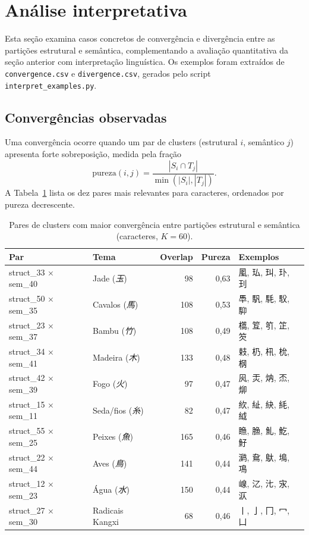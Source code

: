 \documentclass[10pt, a4paper, titlepage]{extarticle}
\begin{document}
\section{Análise interpretativa}
Esta seção examina casos concretos de convergência e divergência entre as partições estrutural e semântica, complementando a avaliação quantitativa da seção anterior com interpretação linguística. Os exemplos foram extraídos de \texttt{convergence.csv} e \texttt{divergence.csv}, gerados pelo script \texttt{interpret\_examples.py}.

\subsection{Convergências observadas}
Uma convergência ocorre quando um par de clusters (estrutural $i$,
semântico $j$) apresenta forte sobreposição, medida pela fração
\[
    \text{pureza}(i,j) = \frac{|S_i \cap T_j|}{\min(|S_i|, |T_j|)}.
\]
A Tabela~\ref{tab:convergencias} lista os dez pares mais relevantes para
caracteres, ordenados por pureza decrescente.

\begin{table}[H]
\centering
\small
\renewcommand{\arraystretch}{1.15}
\begin{tabular}{llrrp{4.2cm}}
\toprule
\textbf{Par} & \textbf{Tema} & \textbf{Overlap} & \textbf{Pureza} &
\textbf{Exemplos} \\
\midrule
struct\_33 $\times$ sem\_40 & Jade (\textit{玉})     & 98  & 0,63 &
    㓘, 㺨, 㺩, 㺪, 㺫 \\
struct\_50 $\times$ sem\_35 & Cavalos (\textit{馬})  & 108 & 0,53 &
    䭴, 䭵, 䭷, 䭸, 䭹 \\
struct\_23 $\times$ sem\_37 & Bambu (\textit{竹})    & 108 & 0,49 &
    㰏, 䇘, 䇙, 䇛, 䇜 \\
struct\_34 $\times$ sem\_41 & Madeira (\textit{木})  & 133 & 0,48 &
    㩽, 㭁, 㭄, 㭇, 㭎 \\
struct\_42 $\times$ sem\_39 & Fogo (\textit{火})     & 97  & 0,47 &
    㶡, 㶣, 㶧, 㶨, 㶯 \\
struct\_15 $\times$ sem\_11 & Seda/fios (\textit{糸})& 82  & 0,47 &
    䊻, 䊼, 䊽, 䋃, 䋐 \\
struct\_55 $\times$ sem\_25 & Peixes (\textit{魚})   & 165 & 0,46 &
    䁩, 䐳, 䰲, 䰴, 䰵 \\
struct\_22 $\times$ sem\_44 & Aves (\textit{鳥})     & 141 & 0,44 &
    㶉, 䲥, 䲦, 䲧, 䲨 \\
struct\_12 $\times$ sem\_23 & Água (\textit{水})     & 150 & 0,44 &
    㟫, 㲸, 㲺, 㲾, 㳁 \\
struct\_27 $\times$ sem\_30 & Radicais Kangxi        & 68  & 0,46 &
    丨, 亅, 冂, 冖, 凵 \\
\bottomrule
\end{tabular}
\caption{Pares de clusters com maior convergência entre partições estrutural
e semântica (caracteres, $K=60$).}
\label{tab:convergencias}
\end{table}
\end{document}
